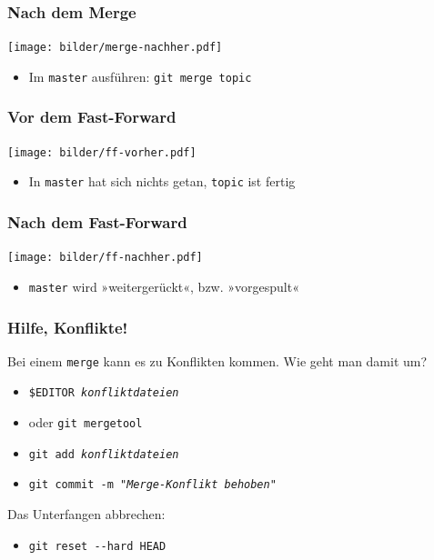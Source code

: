 \documentclass{beamer}
\begin{document}
\begin{frame}
 \frametitle{Nach dem Merge}



\begin{center}
\texttt{[image: bilder/merge-nachher.pdf]}
\end{center}

\begin{itemize}
	\item Im \texttt{master} ausführen: \texttt{git merge topic}
\end{itemize}


 \end{frame}
\begin{frame}
 \frametitle{Vor dem Fast-Forward}



\begin{center}
\texttt{[image: bilder/ff-vorher.pdf]}
\end{center}

\begin{itemize}
	\item In \texttt{master} hat sich nichts getan, \texttt{topic} ist fertig
\end{itemize}


 \end{frame}
\begin{frame}
 \frametitle{Nach dem Fast-Forward}



\begin{center}
\texttt{[image: bilder/ff-nachher.pdf]}
\end{center}

\begin{itemize}
	\item \texttt{master} wird »weitergerückt«, bzw. »vorgespult«
\end{itemize}


 \end{frame}
\begin{frame}
 \frametitle{Hilfe, Konflikte!}



Bei einem \texttt{merge} kann es zu Konflikten kommen. Wie geht man damit um?
\begin{itemize}
	\item \texttt{\$EDITOR \emph{konfliktdateien}}
	\item[]{ oder \texttt{git mergetool} }
	\item \texttt{git add \emph{konfliktdateien}}
	\item \texttt{git commit -m "\emph{Merge-Konflikt behoben}"}
\end{itemize}


\vspace{.5em}

Das Unterfangen abbrechen:
\begin{itemize}
	\item \texttt{git reset -{}-hard HEAD}
\end{itemize}

\end{frame}
\end{document}
